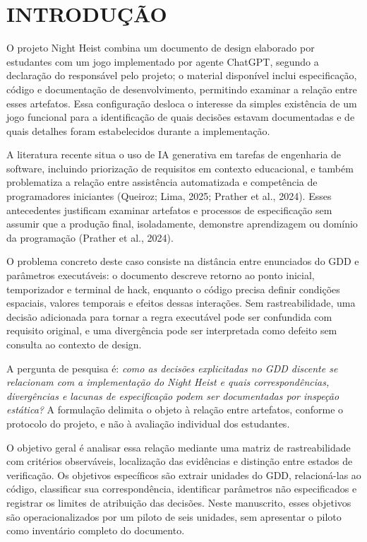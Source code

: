 \section{INTRODUÇÃO}
O projeto Night Heist combina um documento de design elaborado por estudantes com um jogo implementado por agente ChatGPT, segundo a declaração do responsável pelo projeto; o material disponível inclui especificação, código e documentação de desenvolvimento, permitindo examinar a relação entre esses artefatos. Essa configuração desloca o interesse da simples existência de um jogo funcional para a identificação de quais decisões estavam documentadas e de quais detalhes foram estabelecidos durante a implementação.

A literatura recente situa o uso de IA generativa em tarefas de engenharia de software, incluindo priorização de requisitos em contexto educacional, e também problematiza a relação entre assistência automatizada e competência de programadores iniciantes (Queiroz; Lima, 2025; Prather et al., 2024). Esses antecedentes justificam examinar artefatos e processos de especificação sem assumir que a produção final, isoladamente, demonstre aprendizagem ou domínio da programação (Prather et al., 2024).

O problema concreto deste caso consiste na distância entre enunciados do GDD e parâmetros executáveis: o documento descreve retorno ao ponto inicial, temporizador e terminal de hack, enquanto o código precisa definir condições espaciais, valores temporais e efeitos dessas interações. Sem rastreabilidade, uma decisão adicionada para tornar a regra executável pode ser confundida com requisito original, e uma divergência pode ser interpretada como defeito sem consulta ao contexto de design.

A pergunta de pesquisa é: \emph{como as decisões explicitadas no GDD discente se relacionam com a implementação do Night Heist e quais correspondências, divergências e lacunas de especificação podem ser documentadas por inspeção estática?} A formulação delimita o objeto à relação entre artefatos, conforme o protocolo do projeto, e não à avaliação individual dos estudantes.

O objetivo geral é analisar essa relação mediante uma matriz de rastreabilidade com critérios observáveis, localização das evidências e distinção entre estados de verificação. Os objetivos específicos são extrair unidades do GDD, relacioná-las ao código, classificar sua correspondência, identificar parâmetros não especificados e registrar os limites de atribuição das decisões. Neste manuscrito, esses objetivos são operacionalizados por um piloto de seis unidades, sem apresentar o piloto como inventário completo do documento.

